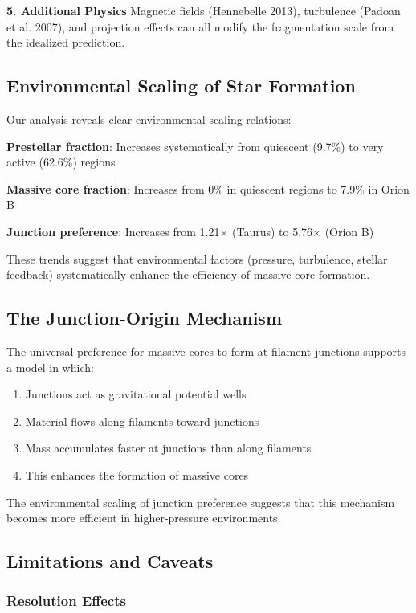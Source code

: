 \documentclass[11pt,a4paper]{article}
\begin{document}
\textbf{5. Additional Physics}
Magnetic fields (Hennebelle 2013), turbulence (Padoan et al. 2007), and projection effects can all modify the fragmentation scale from the idealized prediction.

\subsection{Environmental Scaling of Star Formation}

Our analysis reveals clear environmental scaling relations:

\textbf{Prestellar fraction}: Increases systematically from quiescent (9.7\%) to very active (62.6\%) regions

\textbf{Massive core fraction}: Increases from 0\% in quiescent regions to 7.9\% in Orion B

\textbf{Junction preference}: Increases from 1.21$\times$ (Taurus) to 5.76$\times$ (Orion B)

These trends suggest that environmental factors (pressure, turbulence, stellar feedback) systematically enhance the efficiency of massive core formation.

\subsection{The Junction-Origin Mechanism}

The universal preference for massive cores to form at filament junctions supports a model in which:
\begin{enumerate}
    \item Junctions act as gravitational potential wells
    \item Material flows along filaments toward junctions
    \item Mass accumulates faster at junctions than along filaments
    \item This enhances the formation of massive cores
\end{enumerate}

The environmental scaling of junction preference suggests that this mechanism becomes more efficient in higher-pressure environments.

\subsection{Limitations and Caveats}

\subsubsection{Resolution Effects}
\end{document}
